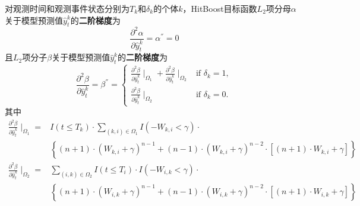 \begin{theorem}\label{thm:1.4}
对观测时间和观测事件状态分别为$T_k$和$\delta_k$的个体$k$，HitBoost目标函数$L_2$项分母$\alpha$关于模型预测值$\hat{y}_t^k$的\textbf{二阶梯度}为$$
\frac{\partial^2 \alpha}{\partial \hat{y}_t^k}=\alpha^{''}=0
$$ 且$L_2$项分子$\beta$关于模型预测值$\hat{y}_t^k$的\textbf{二阶梯度}为$$
\frac{\partial^2 \beta}{\partial \hat{y}_t^k}=\beta^{''}=
\begin{cases}
\frac{\partial^2 \beta}{\partial \hat{y}_t^k} \mid_{\Omega_1} + \frac{\partial^2 \beta}{\partial \hat{y}_t^k} \mid_{\Omega_2} & \text{if } \delta_k = 1,\\
\frac{\partial^2 \beta}{\partial \hat{y}_t^k} \mid_{\Omega_2} & \text{if } \delta_k = 0.
\end{cases}
$$ 其中\[
\begin{split}
\frac{\partial^2 \beta}{\partial \hat{y}_t^k} \mid_{\Omega_1} =& I(t\le T_k)\cdot \sum\limits_{(k,i)\in \Omega_1} I(-W_{k,i}<\gamma)\cdot \\
  & \left\{(n+1)\cdot (W_{k,i}+\gamma)^{n-1} + (n-1)\cdot (W_{k,i}+\gamma)^{n-2}\cdot [(n+1)\cdot W_{k,i}+\gamma]\right\} \\
\frac{\partial^2 \beta}{\partial \hat{y}_t^k} \mid_{\Omega_2} =& \sum\limits_{(i,k)\in \Omega_2} I(t\le T_i)\cdot I(-W_{i,k}<\gamma)\cdot \\
  & \left\{(n+1)\cdot (W_{i,k}+\gamma)^{n-1} + (n-1)\cdot (W_{i,k}+\gamma)^{n-2}\cdot [(n+1)\cdot W_{i,k}+\gamma]\right\}
\end{split}
\]
\end{theorem}

